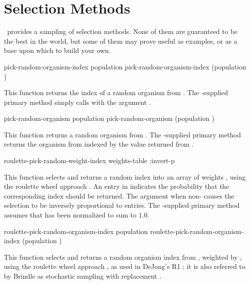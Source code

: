 {	\section{Selection Methods}
	\label{sec:selection-methods}
	
	\Geco\ provides a sampling of selection methods. None of them are
	guaranteed to be the best in the world, but some of them may prove useful as examples, or
	as a base upon which to build your own.
	
	\filbreak
	{\samepage
		\Defgeneric pick-random-organism-index {population}
		 pick-random-organism-index {(population )}
		
		This function returns the index of a random organism from . The
		\geco-supplied primary method simply calls  with the
		argument .
		\par}%
	
	\filbreak
	{\samepage
		\Defgeneric pick-random-organism {population}
		 pick-random-organism {(population )}
		
		This function returns a random organism from .  The
		\geco-supplied primary method returns the organism from 
		indexed by the value returned from .
		\par}%
	
	\filbreak
	{\samepage
		\Defun roulette-pick-random-weight-index {weights-table \key :invert-p}
		
		This function selects and returns a random index into an array of weights , using
		the roulette wheel approach \cite{ga:goldberg}. An entry in 
		indicates the probability that the corresponding index should be returned. The
		 argument when non- causes the selection to be inversely
		proportional to  entries. The \geco-supplied primary method assumes
		that  has been normalized to sum to $1.0$.
		\par}%
	
	\filbreak
	{\samepage
		\Defmethod roulette-pick-random-organism-index {population}
		 roulette-pick-random-organism-index {(population )}
		
		This function selects and returns a random organism index from , weighted by
		, using the roulette wheel approach \cite{ga:goldberg}, as used in
		DeJong's R1 \cite{ga:dejong-thesis}; it is also referred to by Brindle as stochastic
		sampling with replacement \cite{ga:brindle}.
		\par}%
	
}

